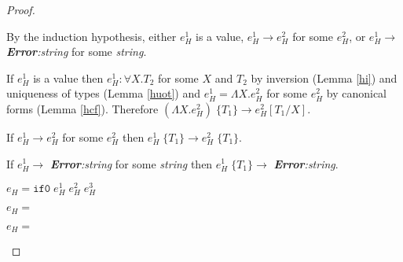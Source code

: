 \begin{hps}
\begin{proof}
\begin{hps-case-8}
By the induction hypothesis, either $e_{H}^{1}$ is a value, $e_{H}^{1}\rightarrow e_{H}^{2}$ for some $e_{H}^{2}$, or $e_{H}^{1}\rightarrow$ \emph{\textbf{Error}:\;string} for some \emph{string}.

If $e_{H}^{1}$ is a value then $e_{H}^{1}:\forall X.T_{2}$ for some $X$ and $T_{2}$ by inversion (Lemma \ref{hi}) and uniqueness of types (Lemma \ref{huot}) and $e_{H}^{1}=\Lambda X.e_{H}^{2}$ for some $e_{H}^{2}$ by canonical forms (Lemma \ref{hcf}).  Therefore $(\Lambda X.e_{H}^{2})\;\lbrace T_{1}\rbrace\rightarrow e_{H}^{2}[T_{1}/X]$.

If $e_{H}^{1}\rightarrow e_{H}^{2}$ for some $e_{H}^{2}$ then $e_{H}^{1}\;\lbrace T_{1}\rbrace\rightarrow e_{H}^{2}\;\lbrace T_{1}\rbrace$.

If $e_{H}^{1}\rightarrow$ \emph{\textbf{Error}:\;string} for some \emph{string} then $e_{H}^{1}\;\lbrace T_{1}\rbrace\rightarrow$ \emph{\textbf{Error}:\;string}.
\end{hps-case-8}
\begin{hps-case-9}
$e_{H}=\mathtt{if0}\;e_{H}^{1}\;e_{H}^{2}\;e_{H}^{3}$


\end{hps-case-9}
\begin{hps-case-10}
$e_{H}=$


\end{hps-case-10}
\begin{hps-case-11}
$e_{H}=$


\end{hps-case-11}
\end{proof}
\end{hps}